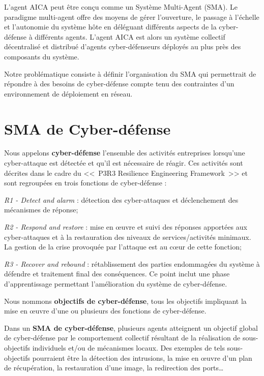 L'agent AICA peut être conçu comme un Système Multi-Agent (SMA). Le paradigme multi-agent offre des moyens de gérer l'ouverture, le passage à l'échelle et l'autonomie du système hôte en déléguant différents aspects de la cyber-défense à différents agents. L'agent AICA  est alors un système collectif décentralisé et distribué d'agents cyber-défenseurs déployés au plus près des composants du système\cite{ieeesp_KottT20}.

Notre problématique consiste à définir l'organisation du SMA qui permettrait de répondre à des besoins de cyber-défense compte tenu des contraintes d'un environnement de déploiement en réseau.


\section{SMA de Cyber-défense}

Nous appelons \textbf{cyber-défense} l'ensemble des activités entreprises lorsqu'une cyber-attaque est détectée et qu'il est nécessaire de réagir\cite{theron_autonomous_2021}. Ces activités sont décrites dans le cadre du <<~P3R3 Resilience Engineering Framework~>>\cite{Theron2013P3R3} et sont regroupées en trois fonctions de cyber-défense :

\textit{R1 - Detect and alarm} : détection des cyber-attaques  et déclenchement des mécanismes de réponse;

\textit{R2 - Respond and restore} : mise en œuvre et suivi des réponses apportées aux cyber-attaques et à la restauration des niveaux de services/activités minimaux. La gestion de la crise provoquée par l'attaque est au cœur de cette fonction;

\textit{R3 - Recover and rebound} : rétablissement des parties endommagées du système à défendre et traitement final des conséquences. Ce point inclut une phase d'apprentissage permettant l'amélioration du système de cyber-défense.


Nous nommons \textbf{objectifs de cyber-défense}, tous les objectifs impliquant la mise en œuvre d'une ou plusieurs des fonctions de cyber-défense.

Dans un \textbf{SMA de cyber-défense}, plusieurs agents atteignent un objectif global de cyber-défense par le comportement collectif résultant de la réalisation de sous-objectifs individuels et/ou de mécanismes locaux\cite{jamont2015meeting}. Des exemples de tels sous-objectifs pourraient être la détection des intrusions, la mise en œuvre d'un plan de récupération, la restauration d'une image, la redirection des ports\dots



